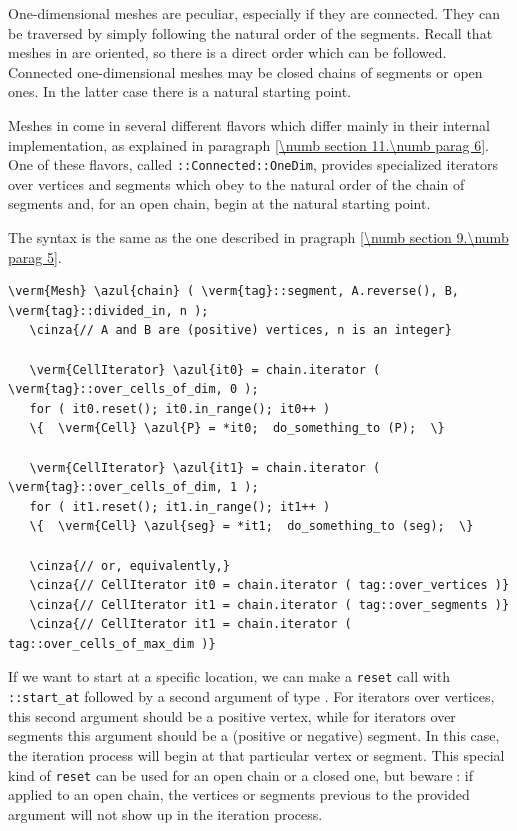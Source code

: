 One-dimensional meshes are peculiar, especially if they are connected.
They can be traversed by simply following the natural order of the segments.
Recall that meshes in {\maniFEM} are oriented, so there is a direct order which can be followed.
Connected one-dimensional meshes may be closed chains of segments or open ones.
In the latter case there is a natural starting point.

Meshes in {\maniFEM} come in several different flavors which differ mainly in their internal
implementation, as explained in paragraph \ref{\numb section 11.\numb parag 6}.
One of these flavors, called {\small\tt {}::Connected::OneDim}, provides specialized iterators
over vertices and segments which obey to the natural order of the chain of segments and,
for an open chain, begin at the natural starting point.

The syntax is the same as the one described in pragraph \ref{\numb section 9.\numb parag 5}.

\begin{Verbatim}[commandchars=\\\{\},formatcom=\small\tt,
   baselinestretch=0.94,framesep=2mm                      ]
   \verm{Mesh} \azul{chain} ( \verm{tag}::segment, A.reverse(), B, \verm{tag}::divided_in, n );
   \cinza{// A and B are (positive) vertices, n is an integer}
   
   \verm{CellIterator} \azul{it0} = chain.iterator ( \verm{tag}::over_cells_of_dim, 0 );
   for ( it0.reset(); it0.in_range(); it0++ )
   \{  \verm{Cell} \azul{P} = *it0;  do_something_to (P);  \}

   \verm{CellIterator} \azul{it1} = chain.iterator ( \verm{tag}::over_cells_of_dim, 1 );
   for ( it1.reset(); it1.in_range(); it1++ )
   \{  \verm{Cell} \azul{seg} = *it1;  do_something_to (seg);  \}
   
   \cinza{// or, equivalently,}
   \cinza{// CellIterator it0 = chain.iterator ( tag::over_vertices )}
   \cinza{// CellIterator it1 = chain.iterator ( tag::over_segments )}
   \cinza{// CellIterator it1 = chain.iterator ( tag::over_cells_of_max_dim )}
\end{Verbatim}

If we want to start at a specific location, we can make a {\small\tt reset} call with
{\small\tt {}::start\_at} followed by a second argument of type {\small\tt{}}.
For iterators over vertices, this second argument should be a positive vertex,
while for iterators over segments this argument should be a (positive or negative) segment.
In this case, the iteration process will begin at that particular vertex or segment.
This special kind of {\small\tt reset} can be used for an open chain or a closed one,
but beware$\;$: if applied to an open chain, the vertices or segments previous to the provided
argument will not show up in the iteration process.

